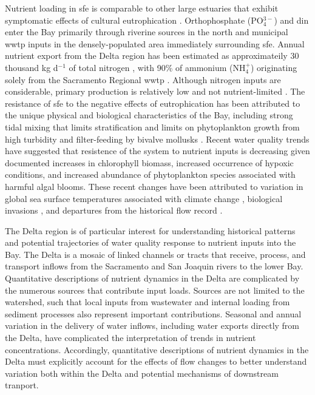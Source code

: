 \documentclass[letterpaper,12pt,oneside]{article}\usepackage[]{graphicx}\usepackage[]{color}
\begin{document}
Nutrient loading in \ac{sfe} is comparable to other large estuaries that exhibit symptomatic effects of cultural eutrophication \citep[e.g., Chesapeake Bay,][]{Kemp05}.  Orthophosphate (PO$_4^{3-}$) and \ac{din} enter the Bay primarily through riverine sources in the north and municipal \ac{wwtp} inputs in the densely-populated area immediately surrounding \ac{sfe}.  Annual nutrient export from the Delta region has been estimated as approximateily 30 thousand kg d$^{-1}$ of total nitrogen \citep[varying with flow,][]{Novick15}, with 90\% of ammonium (NH$_4^{+}$) originating solely from the Sacramento Regional \ac{wwtp} \citep{Jassby08}.  Although nitrogen inputs are considerable, primary production is relatively low and not nutrient-limited \citep{Jassby02,Kimmerer12}.  The resistance of \ac{sfe} to the negative effects of eutrophication has been attributed to the unique physical and biological characteristics of the Bay, including strong tidal mixing that limits stratification \citep{Cloern96,Thompson08} and limits on phytoplankton growth from high turbidity and filter-feeding by bivalve mollusks \citep{Thompson08,Crauder16}.  Recent water quality trends have suggested that resistence of the system to nutrient inputs is decreasing given documented increases in chlorophyll biomass, increased occurrence of hypoxic conditions, and increased abundance of phytoplankton species associated with harmful algal blooms.  These recent changes have been attributed to variation in global sea surface temperatures associated with climate change \citep{Cloern07}, biological invasions \citep{Cohen98}, and departures from the historical flow record \citep{Enright09,Cloern12}.  

The Delta region is of particular interest for understanding historical patterns and potential trajectories of water quality response to nutrient inputs into the Bay.  The Delta is a mosaic of linked channels or tracts that receive, process, and transport inflows from the Sacramento and San Joaquin rivers to the lower Bay.  Quantitative descriptions of nutrient dynamics in the Delta are complicated by the numerous sources that contribute input loads.  Sources are not limited to the watershed, such that local inputs from wastewater and internal loading from sediment processes also represent important contributions.  Seasonal and annual variation in the delivery of water inflows, including water exports directly from the Delta, have complicated the interpretation of trends in nutrient concentrations. Accordingly, quantitative descriptions of nutrient dynamics in the Delta must explicitly account for the effects of flow changes to better understand variation both within the Delta and potential mechanisms of downstream tranport.  
\end{document}
